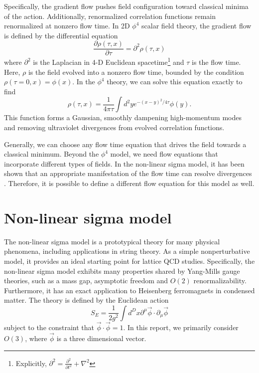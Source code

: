 \documentclass[12pt]{report}
\begin{document}
Specifically, the gradient flow pushes field configuration toward classical minima of the action. Additionally, renormalized correlation functions remain renormalized at nonzero flow time.\cite{luscher2013} In 2D $\phi^4$ scalar field theory, the gradient flow is defined by the differential equation 
\begin{equation}
    \frac{\partial \rho(\tau, x)}{\partial \tau} = \partial^2 \rho(\tau,x)
\end{equation}
where $\partial^2$ is the Laplacian in 4-D Euclidean spacetime\footnote{Explicitly, $\partial^2 = \frac{\partial^2}{\partial t^2} + \nabla^2$} and $\tau$ is the flow time. Here, $\rho$ is the field evolved into a nonzero flow time, bounded by the condition $\rho(\tau=0,x) = \phi(x)$. In the $\phi^4$ theory, we can solve this equation exactly to find \cite{monahan2016}
\begin{equation}
    \rho(\tau, x) = \frac{1}{4 \pi \tau} \int d^2 y e^{-(x-y)^2/4\tau} \phi(y).
\end{equation}
This function forms a Gaussian, smoothly dampening high-momentum modes and removing ultraviolet divergences from evolved correlation functions.\cite{makino2015a}

Generally, we can choose any flow time equation that drives the field towards a classical minimum. Beyond the $\phi^4$ model, we need flow equations that incorporate different types of fields. In the non-linear sigma model, it has been shown that an appropriate manifestation of the flow time can resolve divergences \cite{makino2015a}. Therefore, it is possible to define a different flow equation for this model as well.


\section{Non-linear sigma model}

The non-linear sigma model is a prototypical theory for many physical phenomena, including applications in string theory. As a simple nonperturbative model, it provides an ideal starting point for lattice QCD studies. Specifically, the non-linear sigma model exhibits many properties shared by Yang-Mills gauge theories, such as a mass gap, asymptotic freedom and $O(2)$ renormalizability. Furthermore, it has an exact application to Heisenberg ferromagnets in condensed matter. The theory is defined by the Euclidean action 
\begin{equation}
    S_E = \frac{1}{2g^2} \int d^Dx \partial^\mu \vec\phi \cdot \partial_\mu \vec\phi
\end{equation}
subject to the constraint that $\vec\phi\cdot\vec\phi = 1$. In this report, we primarily consider $O(3)$, where $\vec\phi$ is a three dimensional vector.
\end{document}

